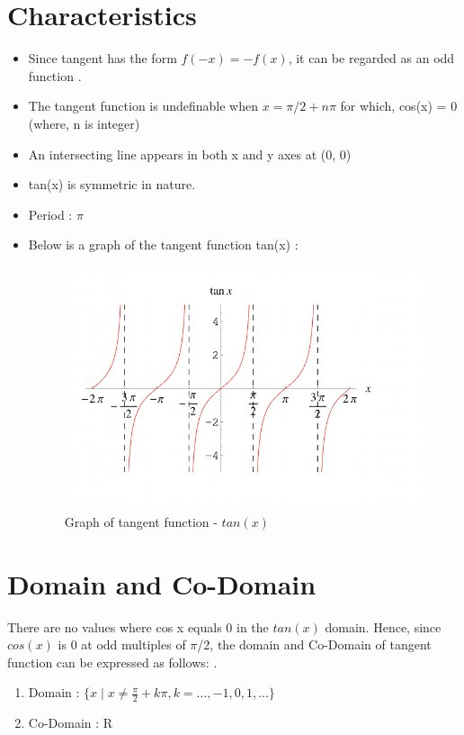 \documentclass[12pt]{article}
\begin{document}
\section*{Characteristics\cite{cuemath_link}\cite{mathlearning_link}\cite{cuemath_domain}\cite{rapidtables_link}}
    \begin{itemize}
        \item Since tangent has the form $f(-x) = -f(x)$, it can be regarded as an odd function \textbf{\cite{cuemath_evenorodd}}.
        \item The tangent function is undefinable when $x = \pi / 2 + n \pi$ for which, cos(x) = 0 (where, n is integer)
        \item An intersecting line appears in both x and y axes at (0, 0)
        \item tan(x) is symmetric in nature.
        \item Period : $\pi $
        \item Below is a graph of the tangent function tan(x) \textbf{\cite{pic_link}}: 
        \begin{figure}[h!]
        \centering
            \includegraphics[width=12cm]{SEP1.png}
                \caption{ Graph of tangent function - $tan(x)$}
        \end{figure}
    \end{itemize}
    \pagebreak 
    
    
\section*{Domain and Co-Domain\cite{cuemath_domain}}
   \indent There are no values where cos x equals 0 in the $tan(x)$ domain. Hence, since $cos(x)$ is 0 at odd multiples of $\pi $/2, the domain and Co-Domain of tangent function can be expressed as follows: .
\begin{enumerate}
\item Domain : $ \{x\mid x \neq \frac{\pi}{2} + k\pi , k= ...,-1,0,1,...   \}$
\item Co-Domain : R
\end{enumerate}
\end{document}
